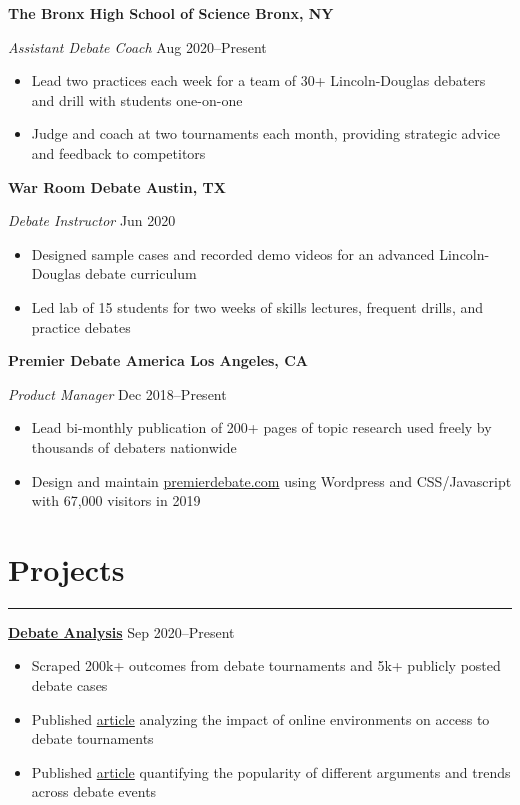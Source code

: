 \documentclass[11pt]{article}
\newcommand{\resumesection}[1]{\vspace{-0.6cm}\section*{\color{highlight}#1}\vspace{-0.3cm}\hrule\vspace{0.2cm}}
\begin{document}
\textbf{The Bronx High School of Science \hfill Bronx, NY} \par
\textit{Assistant Debate Coach}  \hfill Aug 2020--Present
\begin{itemize}
	\item Lead two practices each week for a team of 30+ Lincoln-Douglas debaters and drill with students one-on-one
	\item Judge and coach at two tournaments each month, providing strategic advice and feedback to competitors
\end{itemize}\vspace{0.1cm}

\textbf{War Room Debate \hfill Austin, TX} \par
\textit{Debate Instructor}  \hfill Jun 2020 \par
\begin{itemize}
	\item Designed sample cases and recorded demo videos for an advanced Lincoln-Douglas debate curriculum
	\item Led lab of 15 students for two weeks of skills lectures, frequent drills, and practice debates
\end{itemize}\vspace{0.1cm}

\textbf{Premier Debate America \hfill  Los Angeles, CA} \par
\textit{Product Manager} \hfill Dec 2018--Present \par
\begin{itemize}
	\item Lead bi-monthly publication of 200+ pages of topic research used freely by thousands of debaters nationwide
	\item Design and maintain \href{https://www.premierdebate.com/briefs/}{premierdebate.com} using Wordpress and CSS/Javascript with 67,000 visitors in 2019
\end{itemize}


\resumesection{Projects}

\textbf{\href{https://github.com/petezh/E-Debate}{Debate Analysis}} \hfill Sep 2020--Present\par
\begin{itemize}
	\item Scraped 200k+ outcomes from debate tournaments and 5k+ publicly posted debate cases
	\item Published \href{https://www.vbriefly.com/2020/12/31/five-trends-among-e-debate-competitors-by-peter-zhang/}{article} analyzing the impact of online environments on access to debate tournaments
	\item Published \href{https://www.vbriefly.com/2021/01/22/disclosure-in-numbers-by-peter-zhang/}{article} quantifying the popularity of different arguments and trends across debate events
\end{itemize}\vspace{0.1cm} \par
\end{document}
